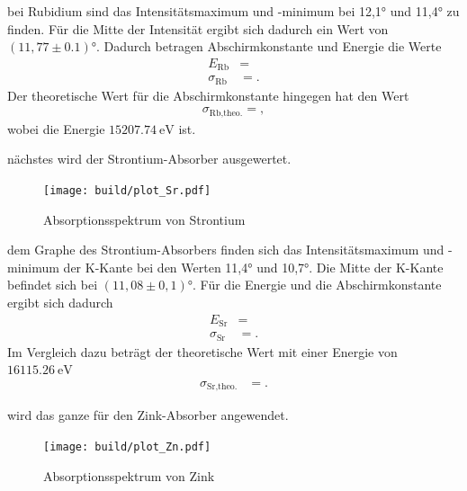 \justifying bei Rubidium sind das Intensitätsmaximum und -minimum bei 12,1° und 11,4° zu finden.
Für die Mitte der Intensität ergibt sich dadurch ein Wert von $(11,77 \pm 0.1)° $.
Dadurch betragen Abschirmkonstante und Energie die Werte
\begin{align}
    E_{\text{Rb}}&= \text{} \label{eq:33}\\
    \sigma _{\text{Rb}} &= \text{} \label{eq:34}.
\end{align}
Der theoretische Wert für die Abschirmkonstante hingegen hat den Wert
\begin{align}
    \sigma _{\text{Rb,theo.}}=\text{} \label{eq:35},
\end{align}
wobei die Energie $\SI{15207.74}{\electronvolt}$ \cite{NIST} ist.

\justifying nächstes wird der Strontium-Absorber ausgewertet.


\begin{figure}[H]
    \centering
    \texttt{[image: build/plot\_Sr.pdf]}
    \caption{Absorptionsspektrum von Strontium\cite{matplotlib}}
    \label{fig:7}
\end{figure}
\justifying dem Graphe des Strontium-Absorbers finden sich das Intensitätsmaximum
und -minimum der K-Kante bei den Werten 11,4° und 10,7°.
Die Mitte der K-Kante befindet sich bei $(11,08\pm0,1)° $.
Für die Energie und die Abschirmkonstante ergibt sich dadurch
\begin{align}
    E_{\text{Sr}}&= \text{} \label{eq:36}\\
    \sigma _{\text{Sr}} &= \text{} \label{eq:37}.
\end{align}
Im Vergleich dazu beträgt der theoretische Wert  mit einer Energie von $\SI{16115.26}{\electronvolt} $ \cite{NIST}
\begin{align}
    \sigma _{\text{Sr,theo.}} &= \text{} \label{eq:38}.
\end{align}


\justifying wird das ganze für den Zink-Absorber angewendet.


\begin{figure}[H]
    \centering
    \texttt{[image: build/plot\_Zn.pdf]}
    \caption{Absorptionsspektrum von Zink\cite{matplotlib}}
    \label{fig:8}
\end{figure}

